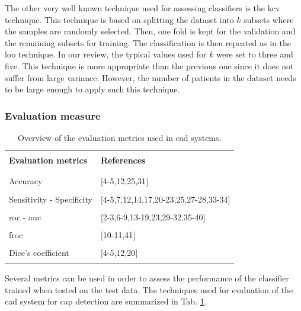 The other very well known technique used for assessing classifiers is the \acf{kcv} technique. This technique is based on splitting the dataset into $k$ subsets where the samples are randomly selected. Then, one fold is kept for the validation and the remaining subsets for training. The classification is then repeated as in the \ac{loo} technique. In our review, the typical values used for $k$ were set to three and five. This technique is more appropriate than the previous one since it does not suffer from large variance. However, the number of patients in the dataset needs to be large enough to apply such this technique.

\subsubsection{Evaluation measure}\label{subsubsec:eval}

\begin{table}
	\caption{Overview of the evaluation metrics used in \ac{cad} systems.}
	\small
	\begin{tabular}{p{.55\linewidth} p{.35\linewidth}}
		\hline \\ [-1.5ex]
		\textbf{Evaluation metrics} & \textbf{References} \\ \\ [-1.5ex]
		\hline \\ [-1.5ex]
		\quad Accuracy & $[$4-5,12,25,31$]$ \\ \\ [-1.5ex]
		\quad Sensitivity - Specificity & $[$4-5,7,12,14,17,20-23,25,27-28,33-34$]$ \\ \\ [-1.5ex]
		\quad \acs{roc} - \acs{auc} & $[$2-3,6-9,13-19,23,29-32,35-40$]$ \\ \\ [-1.5ex]
		\quad \acs{froc} & $[$10-11,41$]$ \\ \\ [-1.5ex]
		\quad Dice's coefficient & $[$4-5,12,20$]$ \\ \\ [-1.5ex]
		\hline
	\end{tabular}
	\label{tab:evatec}
\end{table}

Several metrics can be used in order to assess the performance of the classifier trained when tested on the test data. The techniques used for evaluation of the \ac{cad} system for \ac{cap} detection are summarized in Tab. \ref{tab:evatec}.


